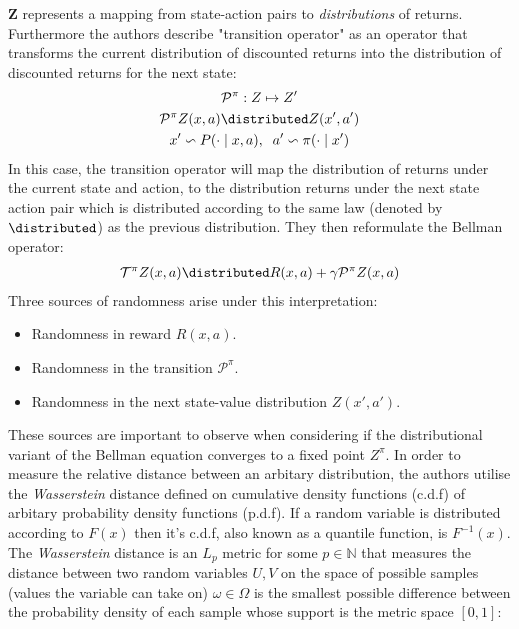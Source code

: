 $\mathbf{Z}$ represents a mapping from state-action pairs to \emph{distributions} of returns.
Furthermore the authors describe "transition operator" as an operator that transforms the current
distribution of discounted returns into the distribution of discounted returns for the next state:
\begin{equation}
    \begin{gathered}
        \mathcal{P}^\pi : Z \mapsto Z'\\
        \mathcal{P}^\pi Z(x,a) \distributed Z(x',a') \\
        x' \backsim P(\cdot \mid x,a), \;\; a' \backsim \pi(\cdot \mid x')
    \end{gathered}
\end{equation}
In this case, the transition operator will map the distribution
of returns under the current state and action, to the distribution returns under the next state action  pair which
is distributed according to the same law (denoted by $\distributed$) as the previous distribution. They then
reformulate the Bellman operator:
\begin{equation}
    \begin{gathered}
        \mathcal{T}^\pi Z(x,a) \distributed R(x,a) + \gamma \mathcal{P}^\pi Z(x,a)
    \end{gathered}
\end{equation}
Three sources of randomness arise under this interpretation:
\begin{itemize}
    \item Randomness in reward $R(x,a)$.
    \item Randomness in the transition $\mathcal{P}^\pi$.
    \item Randomness in the next state-value distribution $Z(x',a')$.
\end{itemize}
These sources are important to observe when considering if the distributional variant of the Bellman equation
converges to a fixed point $Z^\pi$. In order to measure the relative distance between an arbitary distribution,
the authors utilise the \emph{Wasserstein} distance defined on cumulative density functions (c.d.f) of arbitary probability
density functions (p.d.f). If a random variable is distributed according to $F(x)$ then it's c.d.f, also known
as a quantile function, is $F^{-1}(x)$. The \emph{Wasserstein} distance is an $L_p$ metric for some $p \in \mathbb{N}$ that measures the distance
between two random variables $U, V$ on the space of possible samples (values the variable can take on) $\omega \in \Omega$
is the smallest possible difference between the probability density of each sample whose support is the metric space $[0,1]$:
